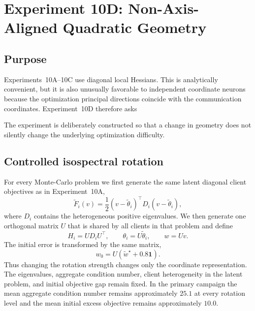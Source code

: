 \section{Experiment 10D: Non-Axis-Aligned Quadratic Geometry}
\label{sec:exp10d}

\subsection{Purpose}

Experiments~10A--10C use diagonal local Hessians. This is analytically convenient, but it is also unusually favorable to independent coordinate neurons because the optimization principal directions coincide with the communication coordinates. Experiment~10D therefore asks
\begin{center}
\end{center}
The experiment is deliberately constructed so that a change in geometry does not silently change the underlying optimization difficulty.

\subsection{Controlled isospectral rotation}

For every Monte-Carlo problem we first generate the same latent diagonal client objectives as in Experiment~10A,
\begin{equation}
  \widetilde F_i(v)
  =\frac12(v-\widetilde\theta_i)^\top D_i(v-\widetilde\theta_i),
\end{equation}
where $D_i$ contains the heterogeneous positive eigenvalues. We then generate one orthogonal matrix $U$ that is shared by all clients in that problem and define
\begin{equation}
  H_i=UD_iU^\top,
  \qquad
  \theta_i=U\widetilde\theta_i,
  \qquad
  w=Uv.
\end{equation}
The initial error is transformed by the same matrix,
\begin{equation}
  w_0=U\left(\widetilde w^\star+0.8\mathbf 1\right).
\end{equation}
Thus changing the rotation strength changes only the coordinate representation. The eigenvalues, aggregate condition number, client heterogeneity in the latent problem, and initial objective gap remain fixed. In the primary campaign the mean aggregate condition number remains approximately $25.1$ at every rotation level and the mean initial excess objective remains approximately $10.0$.

